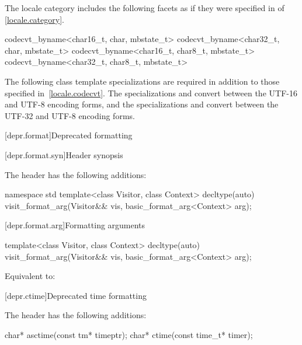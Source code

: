 \pnum
The  locale category includes the following facets
as if they were specified
in  of \ref{locale.category}.

\begin{codeblock}
codecvt_byname<char16_t, char, mbstate_t>
codecvt_byname<char32_t, char, mbstate_t>
codecvt_byname<char16_t, char8_t, mbstate_t>
codecvt_byname<char32_t, char8_t, mbstate_t>
\end{codeblock}

\pnum
The following class template specializations are required
in addition to those specified in~\ref{locale.codecvt}.
%
%
The specializations  and
convert between the UTF-16 and UTF-8 encoding forms, and
%
the specializations  and
convert between the UTF-32 and UTF-8 encoding forms.

[depr.format]{Deprecated formatting}

[depr.format.syn]{Header  synopsis}

\pnum
The header  has the following additions:

\begin{codeblock}
namespace std {
  template<class Visitor, class Context>
    decltype(auto) visit_format_arg(Visitor&& vis, basic_format_arg<Context> arg);
}
\end{codeblock}

[depr.format.arg]{Formatting arguments}

%
\begin{itemdecl}
template<class Visitor, class Context>
  decltype(auto) visit_format_arg(Visitor&& vis, basic_format_arg<Context> arg);
\end{itemdecl}

\begin{itemdescr}
\pnum
\effects
Equivalent to: 
\end{itemdescr}

[depr.ctime]{Deprecated time formatting}

\pnum
The header  has the following additions:

%
%
\begin{codeblock}
char* asctime(const tm* timeptr);
char* ctime(const time_t* timer);
\end{codeblock}


